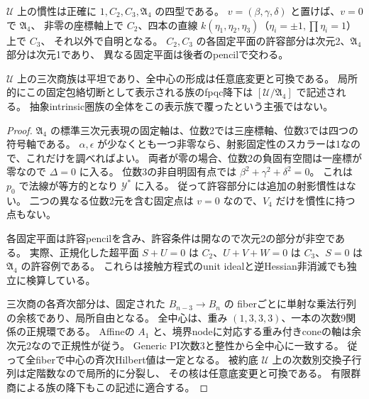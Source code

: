 \begin{proposition}[全慣性型と表示族の底変更]
\label{prop:quantum-triangle-full-inertia}
$\mathcal U$ 上の慣性は正確に $1,C_2,C_3,\mathfrak A_4$ の四型である。
$v=(\beta,\gamma,\delta)$ と置けば、$v=0$ で $\mathfrak A_4$、
非零の座標軸上で $C_2$、四本の直線
$k(\eta_1,\eta_2,\eta_3)$（$\eta_i=\pm1,\prod\eta_i=1$）上で $C_3$、
それ以外で自明となる。
$C_2,C_3$ の各固定平面の許容部分は次元2、$\mathfrak A_4$ 部分は次元1であり、
異なる固定平面は後者のpencilで交わる。

$\mathcal U$ 上の三次商族は平坦であり、全中心の形成は任意底変更と可換である。
局所的にこの固定包絡切断として表示される族のfpqc降下は
$[\mathcal U/\mathfrak A_4]$ で記述される。
抽象intrinsic圏族の全体をこの表示族で覆ったという主張ではない。
\end{proposition}
\begin{proof}
$\mathfrak A_4$ の標準三次元表現の固定軸は、位数2では三座標軸、位数3では四つの符号軸である。
$\alpha,\epsilon$ が少なくとも一つ非零なら、射影固定性のスカラーは1なので、これだけを調べればよい。
両者が零の場合、位数2の負固有空間は一座標が零なので $\Delta=0$ に入る。
位数3の非自明固有点では $\beta^2+\gamma^2+\delta^2=0$。
これは $p_0$ で法線が等方的となり $\mathcal Y^*$ に入る。
従って許容部分には追加の射影慣性はない。
二つの異なる位数2元を含む固定点は $v=0$ なので、$V_4$ だけを慣性に持つ点もない。

各固定平面は許容pencilを含み、許容条件は開なので次元2の部分が非空である。
実際、正規化した超平面 $S+U=0$ は $C_2$、$U+V+W=0$ は $C_3$、$S=0$ は $\mathfrak A_4$ の許容例である。
これらは接触方程式のunit idealと逆Hessian非消滅でも独立に検算している。

三次商の各斉次部分は、固定された $B_{n-3}\to B_n$ の
fiberごとに単射な乗法行列の余核であり、局所自由となる。
全中心は、重み $(1,3,3,3)$、一本の次数9関係の正規環である。
Affineの $A_1$ と、境界nodeに対応する重み付きconeの軸は余次元2なので正規性が従う。
Generic PI次数3と整性から全中心に一致する。
従って全fiberで中心の斉次Hilbert値は一定となる。
被約底 $\mathcal U$ 上の次数別交換子行列は定階数なので局所的に分裂し、
その核は任意底変更と可換である。
有限群商による族の降下もこの記述に適合する。
\end{proof}
